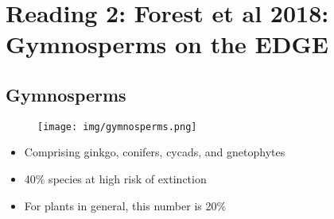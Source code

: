 \section{Reading 2: Forest et al 2018: Gymnosperms on the EDGE}

\subsection{Gymnosperms}

\begin{figure}[H]
    \centering
    \texttt{[image: img/gymnosperms.png]}
\end{figure}

\begin{itemize}
    \item Comprising ginkgo, conifers, cycads, and gnetophytes
    \item 40\% species at high risk of extinction
    \item For plants in general, this number is 20\%
\end{itemize}
